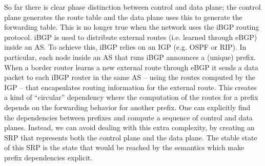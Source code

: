 \documentclass[sigconf,10pt]{acmart}
\begin{document}
So far there is clear phase distinction between control and data
plane; the control plane generates the route table and the data plane
uses this to generate the forwarding table. This is no longer true
when the network uses the iBGP routing protocol. iBGP is used to
distribute external routes (i.e. learned through eBGP) inside an AS.
To achieve this, iBGP relies on an IGP (e.g. OSPF or RIP). In
particular, each node inside an AS that runs iBGP announces a (unique)
prefix. When a border router learns a new external route through eBGP
it sends a data packet to each iBGP router in the same AS -- using the
routes computed by the IGP -- that encapsulates routing information
for the external route. This creates a kind of ``circular'' dependency
where the computation of the routes for a prefix depends on the
forwarding behavior for another prefix. One can explicitly find the
dependencies between prefixes and compute a sequence of control and
data planes. Instead, we can avoid dealing with this extra complexity,
by creating an SRP that represents both the control plane and the data
plane. The stable state of this SRP is the state that would be
reached by the semantics which make prefix dependencies explicit.
\end{document}
